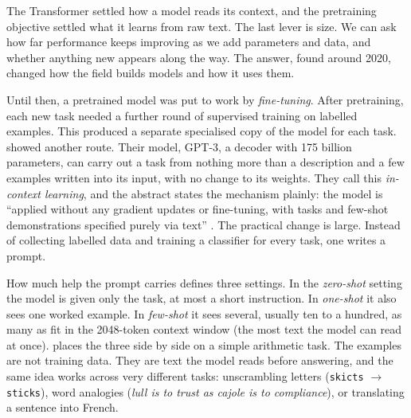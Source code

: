The Transformer settled how a model reads its context, and the pretraining objective
settled what it learns from raw text. The last lever is size. We can ask how far
performance keeps improving as we add parameters and data, and whether anything new
appears along the way. The answer, found around 2020, changed how the field builds
models and how it uses them.

Until then, a pretrained model was put to work by \emph{fine-tuning}. After
pretraining, each new task needed a further round of supervised training on labelled
examples. This produced a separate specialised copy of the model for each task.
\citet{gpt3} showed another route. Their model, GPT-3, a decoder with 175 billion
parameters, can carry out a task from nothing more than a description and a few
examples written into its input, with no change to its weights. They call this
\emph{in-context learning}, and the abstract states the mechanism plainly: the model
is ``applied without any gradient updates or fine-tuning, with tasks and few-shot
demonstrations specified purely via text'' \citep{gpt3}. The practical change is large.
Instead of collecting labelled data and training a classifier for every task, one
writes a prompt.

How much help the prompt carries defines three settings. In the \emph{zero-shot}
setting the model is given only the task, at most a short instruction. In
\emph{one-shot} it also sees one worked example. In \emph{few-shot} it sees several,
usually ten to a hundred, as many as fit in the 2048-token context window (the most
text the model can read at once).  places the three side by side
on a simple arithmetic task. The examples are not training data. They are text the
model reads before answering, and the same idea works across very different tasks:
unscrambling letters (\texttt{skicts} $\to$ \texttt{sticks}), word analogies
(\emph{lull is to trust as cajole is to compliance}), or translating a sentence into
French.

